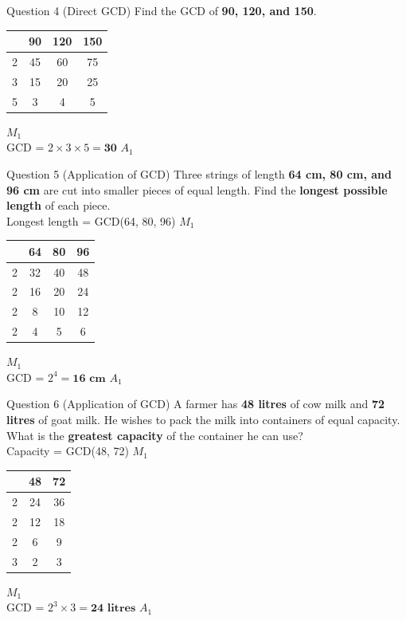 \documentclass[12pt, a4paper, oneside]{article}
\begin{document}
\begin{solvingbox}{Question 4 (Direct GCD)}
Find the GCD of \textbf{90, 120, and 150}. \\
\begin{tabular}{|c|c|c|c|} \hline
    & \textbf{90} & \textbf{120} & \textbf{150} \\ \hline
    2 & 45 & 60 & 75 \\ \hline
    3 & 15 & 20 & 25 \\ \hline
    5 & 3 & 4 & 5 \\ \hline
\end{tabular} \hfill $M_1$ \\
GCD = $2 \times 3 \times 5 = \mathbf{30}$ \hfill $A_1$
\end{solvingbox}

\begin{solvingbox}{Question 5 (Application of GCD)}
Three strings of length \textbf{64 cm, 80 cm, and 96 cm} are cut into smaller pieces of equal length. Find the \textbf{longest possible length} of each piece. \\
Longest length = GCD(64, 80, 96) \hfill $M_1$ \\
\begin{tabular}{|c|c|c|c|} \hline
    & \textbf{64} & \textbf{80} & \textbf{96} \\ \hline
    2 & 32 & 40 & 48 \\ \hline
    2 & 16 & 20 & 24 \\ \hline
    2 & 8 & 10 & 12 \\ \hline
    2 & 4 & 5 & 6 \\ \hline
\end{tabular} \hfill $M_1$ \\
GCD = $2^4 = \mathbf{16\text{ cm}}$ \hfill $A_1$
\end{solvingbox}

\begin{solvingbox}{Question 6 (Application of GCD)}
A farmer has \textbf{48 litres} of cow milk and \textbf{72 litres} of goat milk. He wishes to pack the milk into containers of equal capacity. What is the \textbf{greatest capacity} of the container he can use? \\
Capacity = GCD(48, 72) \hfill $M_1$ \\
\begin{tabular}{|c|c|c|} \hline
    & \textbf{48} & \textbf{72} \\ \hline
    2 & 24 & 36 \\ \hline
    2 & 12 & 18 \\ \hline
    2 & 6 & 9 \\ \hline
    3 & 2 & 3 \\ \hline
\end{tabular} \hfill $M_1$ \\
GCD = $2^3 \times 3 = \mathbf{24\text{ litres}}$ \hfill $A_1$
\end{solvingbox}
\end{document}
